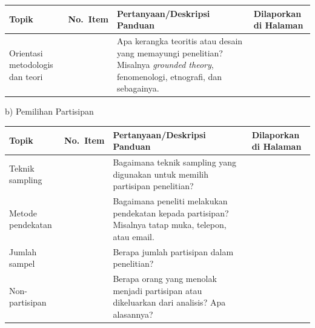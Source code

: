 \documentclass[
  indonesian,
  letterpaper,
  DIV=11,
  numbers=noendperiod]{scrreprt}
\begin{document}
\begin{tcolorbox}
\begin{longtable}[]{@{}
  >{\raggedright\arraybackslash}p{}
  >{\raggedright\arraybackslash}p{}
  >{\raggedright\arraybackslash}p{}
  >{\raggedright\arraybackslash}p{}@{}}
\toprule\noalign{}
\begin{minipage}[b]{\linewidth}\raggedright
Topik
\end{minipage} & \begin{minipage}[b]{\linewidth}\raggedright
No.~Item
\end{minipage} & \begin{minipage}[b]{\linewidth}\raggedright
Pertanyaan/Deskripsi Panduan
\end{minipage} & \begin{minipage}[b]{\linewidth}\raggedright
Dilaporkan di Halaman
\end{minipage} \\
\midrule\noalign{}
\endhead
\bottomrule\noalign{}
\endlastfoot
Orientasi metodologis dan teori & 9 & Apa kerangka teoritis atau desain
yang memayungi penelitian? Misalnya \emph{grounded theory},
fenomenologi, etnografi, dan sebagainya. & \\
\end{longtable}

b) Pemilihan Partisipan

\begin{longtable}[]{@{}
  >{\raggedright\arraybackslash}p{}
  >{\raggedright\arraybackslash}p{}
  >{\raggedright\arraybackslash}p{}
  >{\raggedright\arraybackslash}p{}@{}}
\toprule\noalign{}
\begin{minipage}[b]{\linewidth}\raggedright
Topik
\end{minipage} & \begin{minipage}[b]{\linewidth}\raggedright
No.~Item
\end{minipage} & \begin{minipage}[b]{\linewidth}\raggedright
Pertanyaan/Deskripsi Panduan
\end{minipage} & \begin{minipage}[b]{\linewidth}\raggedright
Dilaporkan di Halaman
\end{minipage} \\
\midrule\noalign{}
\endhead
\bottomrule\noalign{}
\endlastfoot
Teknik sampling & 10 & Bagaimana teknik sampling yang digunakan untuk
memilih partisipan penelitian? & \\
Metode pendekatan & 11 & Bagaimana peneliti melakukan pendekatan kepada
partisipan? Misalnya tatap muka, telepon, atau email. & \\
Jumlah sampel & 12 & Berapa jumlah partisipan dalam penelitian? & \\
Non-partisipan & 13 & Berapa orang yang menolak menjadi partisipan atau
dikeluarkan dari analisis? Apa alasannya? & \\
\end{longtable}


\end{tcolorbox}
\end{document}
